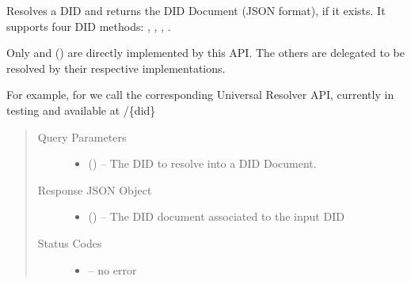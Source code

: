 \documentclass[letterpaper,10pt,english]{sphinxmanual}
\begin{document}
\begin{fulllineitems}
\label{\detokenize{privacycred:get--api-did-v1-identifiers-(string-DID)}}
\sphinxAtStartPar
Resolves a DID and returns the DID Document (JSON format), if it exists.
It supports four DID methods: , , , .

\sphinxAtStartPar
Only  and  () are directly implemented by this API.
The others are delegated to be resolved by their respective implementations.

\sphinxAtStartPar
For example, for  we call the corresponding Universal Resolver API, currently in testing and available at
/\{did\}
\begin{quote}\begin{description}
\item[{Query Parameters}] \leavevmode\begin{itemize}
\item {} 
\sphinxAtStartPar
{} () – The DID to resolve into a DID Document.

\end{itemize}

\item[{Response JSON Object}] \leavevmode\begin{itemize}
\item {} 
\sphinxAtStartPar
{} () – The DID document associated to the input DID

\end{itemize}

\item[{Status Codes}] \leavevmode\begin{itemize}
\item {} 
\sphinxAtStartPar
{} – no error


\end{itemize}
\end{description}
\end{quote}
\end{fulllineitems}
\end{document}
